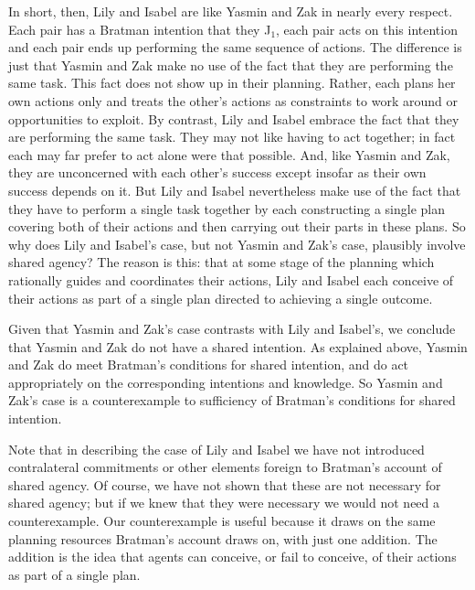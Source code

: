 \documentclass[12pt,\papersize]{extarticle}
\begin{document}
In short, then, Lily and Isabel are like Yasmin and Zak in nearly every respect. 
Each pair has a Bratman intention that they J$_1$, each pair acts on this intention and each pair ends up performing the same sequence of actions.
The difference is just that Yasmin and Zak make no use of the fact that they are performing the same task.
	This fact does not show up in their planning. 
	Rather, each plans her own actions only and treats the other's actions as constraints to work around or opportunities to exploit.
By contrast, Lily and Isabel embrace the fact that they are performing the same task. 
They may not like having to act together; in fact each may far prefer to act alone were that possible.
And, like Yasmin and Zak, they are unconcerned with each other's success except insofar as their own success depends on it.
But Lily and Isabel nevertheless make use of the fact that they have to perform a single task together by each constructing a single plan covering both of their actions and then carrying out their parts in these plans.
So why does Lily and Isabel's case, but not Yasmin and Zak's case, plausibly involve shared agency?
The reason is  this:
	that at some stage of the planning which rationally guides and coordinates their actions,
	Lily and Isabel each conceive of their actions as part of a single plan directed to achieving a single outcome.


Given that Yasmin and Zak's case contrasts with Lily and Isabel's,
we conclude that Yasmin and Zak do not have a shared intention.
As explained above,
 Yasmin and Zak do meet Bratman's conditions for shared intention, and do act appropriately on the corresponding intentions and knowledge. 
 So Yasmin and Zak's case  is a counterexample to sufficiency of Bratman's conditions for shared intention.


Note that in describing the case of Lily and Isabel we have not introduced contralateral commitments or other elements foreign to Bratman's account of shared agency. 
Of course, we have not shown that these are not necessary for shared agency; 
	but if we knew that they were necessary we would not need a counterexample. 
Our counterexample is useful because it draws on the same planning resources Bratman's account draws on, with just one addition.
The addition is the idea that agents can conceive, or fail to conceive, of their actions as part of a single plan. 
\end{document}
